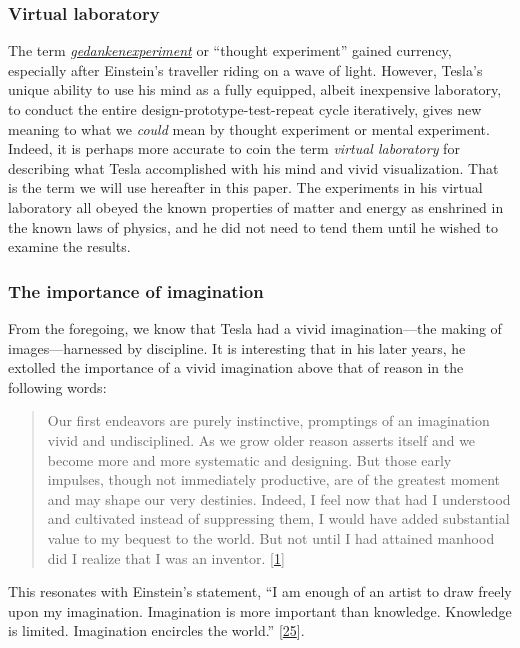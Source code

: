 \documentclass[
  a4paper,
]{article}
\begin{document}
\hypertarget{virtual-laboratory}{%
\subsubsection{Virtual laboratory}\label{virtual-laboratory}}

The term
\href{https://www.britannica.com/science/Gedankenexperiment}{\emph{gedankenexperiment}}
or ``thought experiment'' gained currency, especially after Einstein's
traveller riding on a wave of light. However, Tesla's unique ability to
use his mind as a fully equipped, albeit inexpensive laboratory, to
conduct the entire design-prototype-test-repeat cycle iteratively, gives
new meaning to what we \emph{could} mean by thought experiment or mental
experiment. Indeed, it is perhaps more accurate to coin the term
\emph{virtual laboratory} for describing what Tesla accomplished with
his mind and vivid visualization. That is the term we will use hereafter
in this paper. The experiments in his virtual laboratory all obeyed the
known properties of matter and energy as enshrined in the known laws of
physics, and he did not need to tend them until he wished to examine the
results.

\hypertarget{the-importance-of-imagination}{%
\subsubsection{The importance of
imagination}\label{the-importance-of-imagination}}

From the foregoing, we know that Tesla had a vivid imagination---the
making of images---harnessed by discipline. It is interesting that in
his later years, he extolled the importance of a vivid imagination above
that of reason in the following words:

\begin{quote}
Our first endeavors are purely instinctive, promptings of an imagination
vivid and undisciplined. As we grow older reason asserts itself and we
become more and more systematic and designing. But those early impulses,
though not immediately productive, are of the greatest moment and may
shape our very destinies. Indeed, I feel now that had I understood and
cultivated instead of suppressing them, I would have added substantial
value to my bequest to the world. But not until I had attained manhood
did I realize that I was an inventor.
{[}\protect\hyperlink{ref-john83}{1}{]}
\end{quote}

This resonates with Einstein's statement, ``I am enough of an artist to
draw freely upon my imagination. Imagination is more important than
knowledge. Knowledge is limited. Imagination encircles the world.''
{[}\protect\hyperlink{ref-einstein-quote}{25}{]}.
\end{document}
